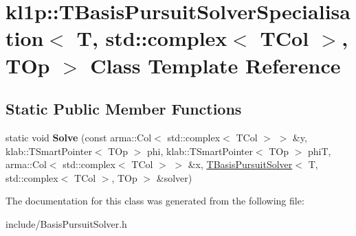\hypertarget{classkl1p_1_1TBasisPursuitSolverSpecialisation_3_01T_00_01std_1_1complex_3_01TCol_01_4_00_01TOp_01_4}{}\section{kl1p\+:\+:T\+Basis\+Pursuit\+Solver\+Specialisation$<$ T, std\+:\+:complex$<$ T\+Col $>$, T\+Op $>$ Class Template Reference}
\label{classkl1p_1_1TBasisPursuitSolverSpecialisation_3_01T_00_01std_1_1complex_3_01TCol_01_4_00_01TOp_01_4}
\subsection*{Static Public Member Functions}
\begin{DoxyCompactItemize}
\item 
static void {\bfseries Solve} (const arma\+::\+Col$<$ std\+::complex$<$ T\+Col $>$ $>$ \&y, klab\+::\+T\+Smart\+Pointer$<$ T\+Op $>$ phi, klab\+::\+T\+Smart\+Pointer$<$ T\+Op $>$ phiT, arma\+::\+Col$<$ std\+::complex$<$ T\+Col $>$ $>$ \&x, \hyperlink{classkl1p_1_1TBasisPursuitSolver}{T\+Basis\+Pursuit\+Solver}$<$ T, std\+::complex$<$ T\+Col $>$, T\+Op $>$ \&solver)\hypertarget{classkl1p_1_1TBasisPursuitSolverSpecialisation_3_01T_00_01std_1_1complex_3_01TCol_01_4_00_01TOp_01_4_a4ff909f734a724391631287f7785b0e5}{}\label{classkl1p_1_1TBasisPursuitSolverSpecialisation_3_01T_00_01std_1_1complex_3_01TCol_01_4_00_01TOp_01_4_a4ff909f734a724391631287f7785b0e5}

\end{DoxyCompactItemize}


The documentation for this class was generated from the following file\+:\begin{DoxyCompactItemize}
\item 
include/Basis\+Pursuit\+Solver.\+h\end{DoxyCompactItemize}
